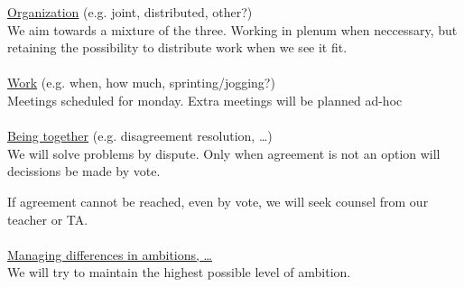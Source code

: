 \underline{Organization} (e.g. joint, distributed, other?) \\
We aim towards a mixture of the three. Working in plenum when neccessary, but retaining the possibility to distribute work when we see it fit. \\ \\
\underline{Work} (e.g. when, how much, sprinting/jogging?) \\
Meetings scheduled for monday.
Extra meetings will be planned ad-hoc \\ \\
\underline{Being together} (e.g. disagreement resolution, \ldots) \\
We will solve problems by dispute. Only when agreement is not an option will decissions be made by vote.

If agreement cannot be reached, even by vote, we will seek counsel from our teacher or TA. \\ \\
\underline{Managing differences in ambitions, \ldots} \\
We will try to maintain the highest possible level of ambition. \\